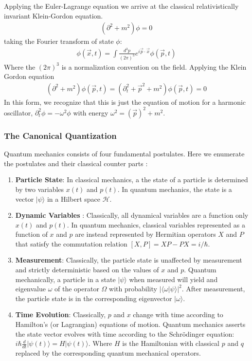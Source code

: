 Applying the Euler-Lagrange equation we arrive at the 
classical relativistically invariant Klein-Gordon equation. 
\begin{align*}
(\partial^2 + m^2 ) \phi = 0
\end{align*}
taking the Fourier transform of state $\phi$:
\begin{align*}
\phi(\vec x, t) = \int \frac{d^3p}{(2\pi)^3} e^{i \vec p \cdot \vec x } \phi (\vec p, t)
\end{align*}
Where the $(2\pi)^3$ is a normalization convention on the field.  Applying the Klein Gordon equation 
\begin{align*}
( \partial^2 + m^2 ) \phi(\vec p, t)  = ( \partial_t^2   +  \vec{p}^2 + m^2)  \phi(\vec p, t) = 0 
\end{align*}
In this form, we recognize that this is just the equation of motion for a harmonic oscillator, $\partial_t^2 \phi = -\omega^2 \phi$
 with energy $\omega^2 = (\vec{p})^2 + m^2$.

\subsubsection{The Canonical Quantization}

Quantum mechanics consists of four fundamental postulates. Here we enumerate the postulates and their classical counter parts \cite{shankar}:
\begin{enumerate}
\item \textbf{Particle State}: In classical mechanics, a the state of a particle is determined by two variables $x(t)$ and $p(t)$. In quantum mechanics, the state is a vector $|\psi \rangle$ in a Hilbert space $\mathcal{H}$.
\item \textbf{Dynamic Variables }: Classically, all dynamical variables are a
 function only $x(t)$ and $p(t)$. In quantum mechanics, classical variables 
represented as a function of $x$ and $p$ are instead 
represented by Hermitian operators $X$ and $P$ that satisfy the commutation 
relation $[X,P] = XP - PX = i/\hbar$. 
\item \textbf{Measurement}: Classically, the particle state is unaffected by measurement and strictly
deterministic based on the values of $x$ and $p$. Quantum mechanically, a particle in a state $|\psi \rangle$ when measured will yield and eigenvalue $\omega$ of the operator $\Omega$ with probability
$|\langle\omega|\psi \rangle|^2$. After measurement, the particle state is in the corresponding eigenvector  $|\omega\rangle$.
\item \textbf{Time Evolution}: Classically, $p$ and $x$ change with time according to Hamilton's (or Lagrangian) equations of motion. Quantum mechanics asserts the state vector evolves with time according to the
Schr\"odinger equation: $i \hbar \frac{d}{dt}|\psi(t) \rangle = H | \psi(t) \rangle$. Where $H$ is the 
Hamiltonian with classical $p$ and $q$ replaced by the corresponding quantum mechanical operators.
\end{enumerate}

